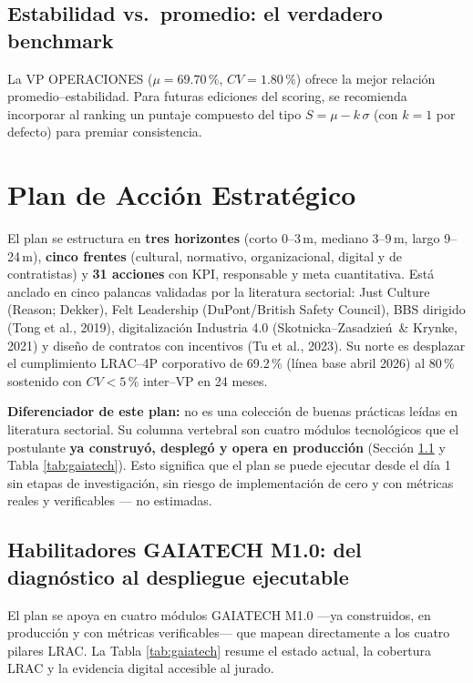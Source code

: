 \documentclass[12pt,a4paper]{article}
\begin{document}
\subsection{Estabilidad vs.\ promedio: el verdadero benchmark}

La VP OPERACIONES ($\mu=69.70\,\%$, $CV=1.80\,\%$) ofrece la mejor relación promedio--estabilidad. Para futuras ediciones del scoring, se recomienda incorporar al ranking un puntaje compuesto del tipo $S=\mu - k\,\sigma$ (con $k=1$ por defecto) para premiar consistencia.

\newpage
\section{Plan de Acción Estratégico}

El plan se estructura en \textbf{tres horizontes} (corto 0--3\,m, mediano 3--9\,m, largo 9--24\,m), \textbf{cinco frentes} (cultural, normativo, organizacional, digital y de contratistas) y \textbf{31 acciones} con KPI, responsable y meta cuantitativa. Está anclado en cinco palancas validadas por la literatura sectorial: Just Culture (Reason; Dekker), Felt Leadership (DuPont/British Safety Council), BBS dirigido (Tong et al., 2019), digitalización Industria 4.0 (Skotnicka--Zasadzień~\& Krynke, 2021) y diseño de contratos con incentivos (Tu et al., 2023). Su norte es desplazar el cumplimiento LRAC--4P corporativo de 69.2\,\% (línea base abril 2026) al 80\,\% sostenido con $CV<5\,\%$ inter--VP en 24 meses.

\textbf{Diferenciador de este plan:} no es una colección de buenas prácticas leídas en literatura sectorial. Su columna vertebral son cuatro módulos tecnológicos que el postulante \textbf{ya construyó, desplegó y opera en producción} (Sección \ref{sec:gaiatech} y Tabla \ref{tab:gaiatech}). Esto significa que el plan se puede ejecutar desde el día 1 sin etapas de investigación, sin riesgo de implementación de cero y con métricas reales y verificables --- no estimadas.

\subsection{Habilitadores GAIATECH M1.0: del diagnóstico al despliegue ejecutable}
\label{sec:gaiatech}

El plan se apoya en cuatro módulos GAIATECH M1.0 ---ya construidos, en producción y con métricas verificables--- que mapean directamente a los cuatro pilares LRAC. La Tabla \ref{tab:gaiatech} resume el estado actual, la cobertura LRAC y la evidencia digital accesible al jurado.
\end{document}
